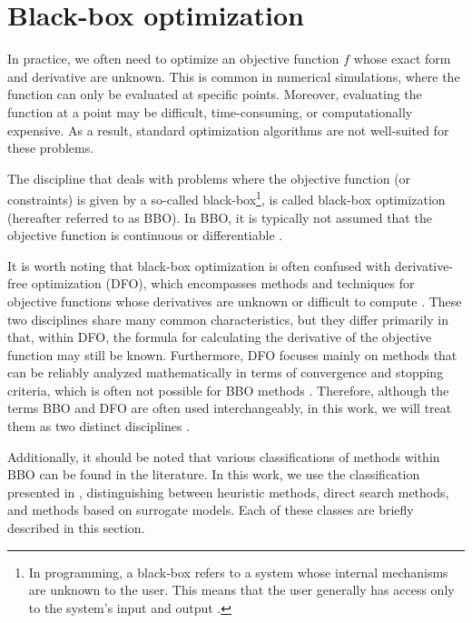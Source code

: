 \section{Black-box optimization}\label{black-box}
In practice, we often need to optimize an objective function $f$ whose exact form and derivative are unknown. This is common in numerical simulations, where the function can only be evaluated at specific points. Moreover, evaluating the function at a point may be difficult, time-consuming, or computationally expensive. As a result, standard optimization algorithms are not well-suited for these problems.

The discipline that deals with problems where the objective function (or constraints) is given by a so-called black-box\footnote{In programming, a black-box refers to a system whose internal mechanisms are unknown to the user. This means that the user generally has access only to the system’s input and output \cite{BBO-textbook}.}, is called black-box optimization (hereafter referred to as BBO). In BBO, it is typically not assumed that the objective function is continuous or differentiable \cite{BBO-textbook, derivative-free-review, two-decades}.

It is worth noting that black-box optimization is often confused with derivative-free optimization (DFO), which encompasses methods and techniques for objective functions whose derivatives are unknown or difficult to compute \cite{BBO-textbook, derivative-free-review, Kramer2011}. These two disciplines share many common characteristics, but they differ primarily in that, within DFO, the formula for calculating the derivative of the objective function may still be known. Furthermore, DFO focuses mainly on methods that can be reliably analyzed mathematically in terms of convergence and stopping criteria, which is often not possible for BBO methods \cite{BBO-textbook}. Therefore, although the terms BBO and DFO are often used interchangeably, in this work, we will treat them as two distinct disciplines \cite{BBO-textbook}.

Additionally, it should be noted that various classifications of methods within BBO can be found in the literature. In this work, we use the classification presented in \cite{BBO-textbook}, distinguishing between heuristic methods, direct search methods, and methods based on surrogate models. Each of these classes are briefly described in this section.




